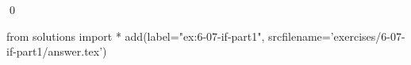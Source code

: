 
\begin{ex}
  \label{ex:6-07-if-part1}
  
  \qed
\end{ex}
\begin{python0}
from solutions import *
add(label="ex:6-07-if-part1",
    srcfilename='exercises/6-07-if-part1/answer.tex')
\end{python0}
